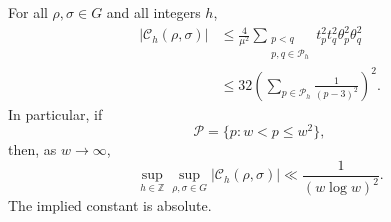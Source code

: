 \begin{theorem}
\label{thm:wt-pair-only-kernel-bound}
For all $\rho,\sigma\in G$ and all integers $h$,
\begin{align}
 |\mathcal C_h(\rho,\sigma)|
 &\le \frac4{\mu^2}
  \sum_{\substack{p<q\\p,q\in\mathcal P_h}}
  t_p^2t_q^2\theta_p^2\theta_q^2
 \label{eq:wt-exact-pairing-bound}\\
 &\le 32\left(\sum_{p\in\mathcal P_h}\frac1{(p-3)^2}\right)^2.
 \label{eq:wt-elementary-pairing-bound}
\end{align}
In particular, if
\begin{equation}
 \mathcal P=\{p:w<p\le w^2\},
 \label{eq:wt-quadratic-prime-window}
\end{equation}
then, as $w\to\infty$,
\begin{equation}
 \sup_{h\in\mathbb Z}\sup_{\rho,\sigma\in G}
 |\mathcal C_h(\rho,\sigma)|
 \ll \frac1{(w\log w)^2}.
 \label{eq:wt-wlogw-pairing-bound}
\end{equation}
The implied constant is absolute.
\end{theorem}

